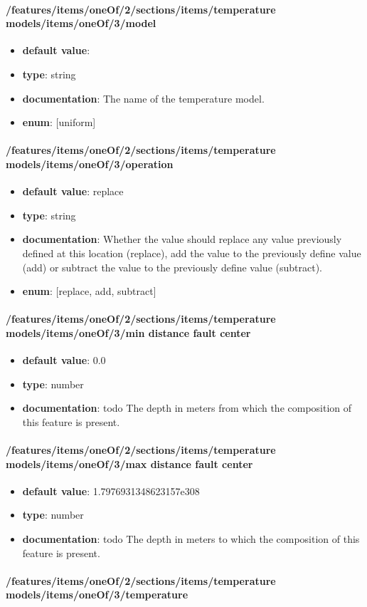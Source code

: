 \paragraph{/features/items/oneOf/2/sections/items/temperature models/items/oneOf/3/model}
\begin{itemize}\item {\bf default value}: 
\item {\bf type}: string
\item {\bf documentation}: The name of the temperature model.
\item {\bf enum}: [uniform]\end{itemize}\paragraph{/features/items/oneOf/2/sections/items/temperature models/items/oneOf/3/operation}
\begin{itemize}\item {\bf default value}: replace
\item {\bf type}: string
\item {\bf documentation}: Whether the value should replace any value previously defined at this location (replace), add the value to the previously define value (add) or subtract the value to the previously define value (subtract).
\item {\bf enum}: [replace, add, subtract]\end{itemize}\paragraph{/features/items/oneOf/2/sections/items/temperature models/items/oneOf/3/min distance fault center}
\begin{itemize}\item {\bf default value}: 0.0
\item {\bf type}: number
\item {\bf documentation}: todo The depth in meters from which the composition of this feature is present.
\end{itemize}\paragraph{/features/items/oneOf/2/sections/items/temperature models/items/oneOf/3/max distance fault center}
\begin{itemize}\item {\bf default value}: 1.7976931348623157e308
\item {\bf type}: number
\item {\bf documentation}: todo The depth in meters to which the composition of this feature is present.
\end{itemize}\paragraph{/features/items/oneOf/2/sections/items/temperature models/items/oneOf/3/temperature}
